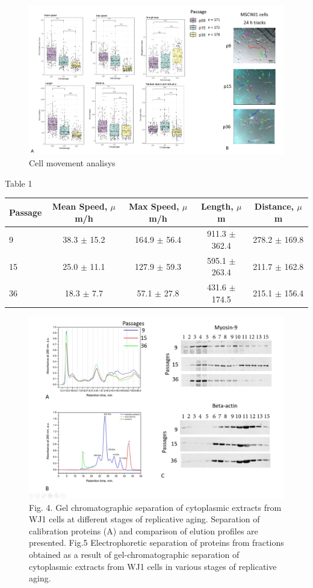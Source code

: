 \documentclass[english,authoryear]{elsarticle}
\begin{document}
\begin{figure}
  \includegraphics[width=0.9\linewidth]{fig8.png}
  \caption{Cell movement analisys}
  \label{fig:fig8}
  \centering
\end{figure}


Table 1

\begin{table}
\centering
\begin{tabular}{|l|c|c|c|c|}
 \hline
 Passage & Mean Speed, $\mu$m/h & Max Speed, $\mu$m/h & Length, $\mu$m  & Distance, $\mu$m \\
 \hline
 9 & 38.3 $\pm$ 15.2 & 164.9 $\pm$ 56.4 & 911.3 $\pm$ 362.4 &  278.2 $\pm$ 169.8 \\
 15 & 25.0 $\pm$ 11.1 & 127.9 $\pm$ 59.3& 595.1 $\pm$ 263.4 & 211.7 $\pm$ 162.8  \\
 36 & 18.3 $\pm$ 7.7 & 57.1 $\pm$ 27.8 & 431.6 $\pm$ 174.5 & 215.1 $\pm$ 156.4 \\
 \hline
\end{tabular}
\end{table}


\begin{figure}[hbt!]
\centering
\includegraphics[width=0.8\linewidth]{fig5.png}
\caption{Fig. 4. Gel chromatographic separation of cytoplasmic extracts from WJ1 cells at different stages of replicative aging. Separation of calibration proteins (A) and comparison of elution profiles are presented. Fig.5 Electrophoretic separation of proteins from fractions obtained as a result of gel-chromatographic separation of cytoplasmic extracts from WJ1 cells in various stages of replicative aging.}
\label{fig:fig5}
\end{figure}
\end{document}
